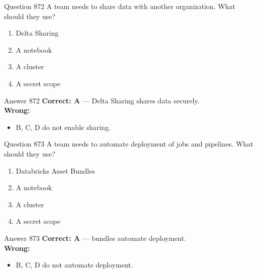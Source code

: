 \documentclass[aspectratio=169,11pt]{beamer}
\begin{document}
	\begin{frame}{Question 872}
		A team needs to share data with another organization. What should they use?
		\begin{enumerate}[label=\Alph*.]
			\item Delta Sharing
			\item A notebook
			\item A cluster
			\item A secret scope
		\end{enumerate}
	\end{frame}
	\begin{frame}{Answer 872}
		\textbf{Correct: A} --- Delta Sharing shares data securely.\\
		\vspace{0.5em}
		\textbf{Wrong:}
		\begin{itemize}
			\item B, C, D do not enable sharing.
		\end{itemize}
	\end{frame}
	
	\begin{frame}{Question 873}
		A team needs to automate deployment of jobs and pipelines. What should they use?
		\begin{enumerate}[label=\Alph*.]
			\item Databricks Asset Bundles
			\item A notebook
			\item A cluster
			\item A secret scope
		\end{enumerate}
	\end{frame}
	\begin{frame}{Answer 873}
		\textbf{Correct: A} --- bundles automate deployment.\\
		\vspace{0.5em}
		\textbf{Wrong:}
		\begin{itemize}
			\item B, C, D do not automate deployment.
		\end{itemize}
	\end{frame}
	
\end{document}
